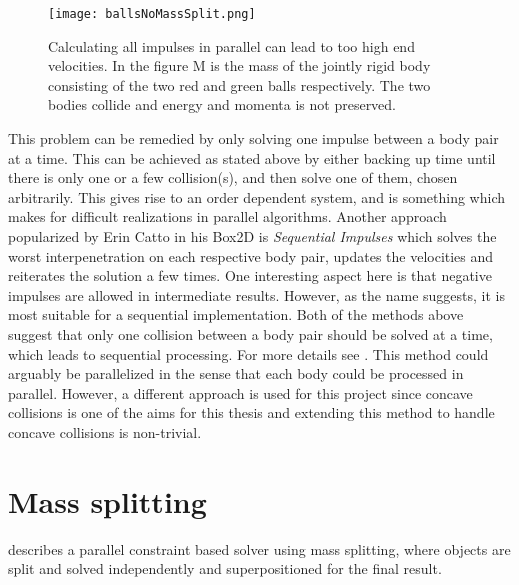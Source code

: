 \begin{figure}[H]
  \centering
  \texttt{[image: ballsNoMassSplit.png]}
  \caption{Calculating all impulses in parallel can lead to too high end velocities.
  In the figure M is the mass of the jointly rigid body consisting of
  the two red and green balls respectively. The two bodies collide and energy and momenta is not preserved.}
  \label{fig:noSplit}
\end{figure}

This problem can be remedied by only solving one impulse between a body pair at a time.
This can be achieved as stated above by either backing up time until there
is only one or a few collision(s), and then solve one of them, chosen
arbitrarily. This gives rise to an order dependent system, and is something which
makes for difficult realizations in parallel algorithms. Another approach popularized
by Erin Catto in his Box2D is \textit{Sequential Impulses} which solves the worst interpenetration
on each respective body pair, updates the velocities and reiterates the solution a few times.
One interesting aspect here is that negative impulses are allowed in intermediate
results. However, as the name suggests, it is most suitable for a sequential implementation.
Both of the methods above suggest that only one collision between a body pair should
be solved at a time, which leads to sequential processing. For more details see \cite{catto}.
This method could arguably be parallelized in the sense that each body could be
processed in parallel. However, a different approach is used for this project since
concave collisions is one of the aims for this thesis and extending this method to
handle concave collisions is non-trivial.

\section{Mass splitting}\label{sec:massSplit}
\cite{tonge} describes a parallel constraint based solver
using mass splitting, where objects are split and solved independently and superpositioned
for the final result.

